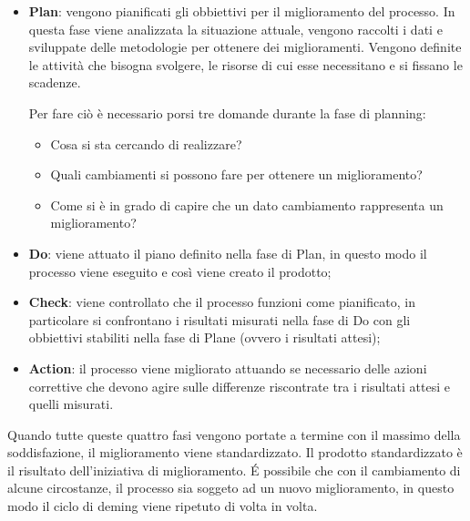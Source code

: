 \begin{itemize}
	\item \textbf{Plan}: vengono pianificati gli obbiettivi per il miglioramento del processo. In questa fase viene analizzata la situazione attuale, vengono raccolti i dati e sviluppate delle metodologie per ottenere dei miglioramenti. Vengono definite le attività che bisogna svolgere, le risorse di cui esse necessitano e si fissano le scadenze.
	
	Per fare ciò è necessario porsi tre domande durante la fase di planning:
	\begin{itemize}
		\item Cosa si sta cercando di realizzare?
		\item Quali cambiamenti si possono fare per ottenere un miglioramento?
		\item Come si è in grado di capire che un dato cambiamento rappresenta un miglioramento?
	\end{itemize}

	\item \textbf{Do}: viene attuato il piano definito nella fase di Plan, in questo modo il processo viene eseguito e così viene creato il prodotto;
	
	\item \textbf{Check}: viene controllato che il processo funzioni come pianificato, in particolare si confrontano i risultati misurati nella fase di Do con gli obbiettivi stabiliti nella fase di Plane (ovvero i risultati attesi);
	
	\item \textbf{Action}: il processo viene migliorato attuando se necessario delle azioni correttive che devono agire sulle differenze riscontrate tra i risultati attesi e quelli misurati.
\end{itemize}

Quando tutte queste quattro fasi vengono portate a termine con il massimo della soddisfazione, il miglioramento viene standardizzato. Il prodotto standardizzato è il risultato dell'iniziativa di miglioramento. É possibile che con il cambiamento di alcune circostanze, il processo sia soggeto ad un nuovo miglioramento, in questo modo il ciclo di deming viene ripetuto di volta in volta.